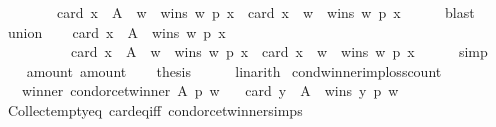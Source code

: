 \begin{isabellebody}
\ \ \ \ \ \ \ \ card\ {\isacharbraceleft}{\kern0pt}x\ {\isasymin}\ A\ {\isacharminus}{\kern0pt}\ {\isacharbraceleft}{\kern0pt}w{\isacharbraceright}{\kern0pt}\ {\isachardot}{\kern0pt}\ wins\ w\ p\ x{\isacharbraceright}{\kern0pt}\ {\isacharplus}{\kern0pt}\ card\ {\isacharbraceleft}{\kern0pt}x\ {\isasymin}\ {\isacharbraceleft}{\kern0pt}w{\isacharbraceright}{\kern0pt}\ {\isachardot}{\kern0pt}\ wins\ w\ p\ x{\isacharbraceright}{\kern0pt}{\isachardoublequoteclose}\isanewline
\ \ \ \ \isamarkupfalse%
\ blast\isanewline
\ \ \isamarkupfalse%
\ union\isanewline
\ \ \isamarkupfalse%
\ {\isachardoublequoteopen}card\ {\isacharbraceleft}{\kern0pt}x\ {\isasymin}\ A\ {\isachardot}{\kern0pt}\ wins\ w\ p\ x{\isacharbraceright}{\kern0pt}\ {\isacharequal}{\kern0pt}\isanewline
\ \ \ \ \ \ \ \ \ \ card\ {\isacharbraceleft}{\kern0pt}x\ {\isasymin}\ A\ {\isacharminus}{\kern0pt}\ {\isacharbraceleft}{\kern0pt}w{\isacharbraceright}{\kern0pt}\ {\isachardot}{\kern0pt}\ wins\ w\ p\ x{\isacharbraceright}{\kern0pt}\ {\isacharplus}{\kern0pt}\ card\ {\isacharbraceleft}{\kern0pt}x\ {\isasymin}\ {\isacharbraceleft}{\kern0pt}w{\isacharbraceright}{\kern0pt}\ {\isachardot}{\kern0pt}\ wins\ w\ p\ x{\isacharbraceright}{\kern0pt}{\isachardoublequoteclose}\isanewline
\ \ \ \ \isamarkupfalse%
\ simp\isanewline
\ \ \isamarkupfalse%
\ amount{}\ amount{}\isanewline
\ \ \isamarkupfalse%
\ {\isacharquery}{\kern0pt}thesis\isanewline
\ \ \ \ \isamarkupfalse%
\ linarith\isanewline
{}\isamarkupfalse%
%
\endisatagproof
{\isafoldproof}%
%
\isadelimproof
\isanewline
%
\endisadelimproof
\isanewline
\isanewline
{}\isamarkupfalse%
\ cond{\isacharunderscore}{\kern0pt}winner{\isacharunderscore}{\kern0pt}imp{\isacharunderscore}{\kern0pt}loss{\isacharunderscore}{\kern0pt}count{\isacharcolon}{\kern0pt}\isanewline
\ \ \ winner{\isacharcolon}{\kern0pt}\ {\isachardoublequoteopen}condorcet{\isacharunderscore}{\kern0pt}winner\ A\ p\ w{\isachardoublequoteclose}\isanewline
\ \ \ {\isachardoublequoteopen}card\ {\isacharbraceleft}{\kern0pt}y\ {\isasymin}\ A\ {\isachardot}{\kern0pt}\ wins\ y\ p\ w{\isacharbraceright}{\kern0pt}\ {\isacharequal}{\kern0pt}\ {}{\isachardoublequoteclose}\isanewline
%
\isadelimproof
\ \ %
\endisadelimproof
%
\isatagproof
{}\isamarkupfalse%
\ Collect{\isacharunderscore}{\kern0pt}empty{\isacharunderscore}{\kern0pt}eq\ card{\isacharunderscore}{\kern0pt}eq{\isacharunderscore}{\kern0pt}{}{\isacharunderscore}{\kern0pt}iff\ condorcet{\isacharunderscore}{\kern0pt}winner{\isachardot}{\kern0pt}simps\isanewline

\end{isabellebody}
